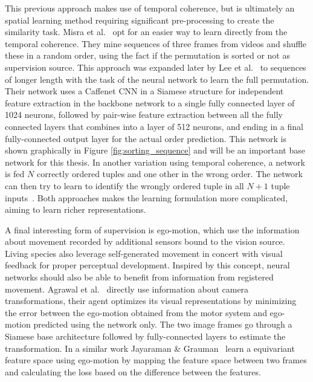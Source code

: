 This previous approach makes use of temporal coherence, but is ultimately an spatial learning method requiring significant pre-processing to create the similarity task. Misra et al.~\cite{misra2016} opt for an easier way to learn directly from the temporal coherence. They mine sequences of three frames from videos and shuffle these in a random order, using the fact if the permutation is sorted or not as supervision source. This approach was expanded later by Lee et al.~\cite{lee2017} to sequences of longer length with the task of the neural network to learn the full permutation. Their network uses a Caffenet\cite{jia2014} CNN in a Siamese structure for independent feature extraction in the backbone network to a single fully connected layer of 1024 neurons, followed by pair-wise feature extraction between all the fully connected layers that combines into a layer of 512 neurons, and ending in a final fully-connected output layer for the actual order prediction. This network is shown graphically in Figure \ref{fig:sorting_sequence} and will be an important base network for this thesis. In another variation using temporal coherence, a network is fed $N$ correctly ordered tuples and one other in the wrong order. The network can then try to learn to identify the wrongly ordered tuple in all $N+1$ tuple inputs~\cite{fernando2017}. Both approaches makes the learning formulation more complicated, aiming to learn richer representations. 

A final interesting form of supervision is ego-motion, which use the information about movement recorded by additional sensors bound to the vision source. Living species also leverage self-generated movement in concert with visual feedback for proper perceptual development. Inspired by this concept, neural networks should also be able to benefit from information from registered movement. Agrawal et al.~\cite{agrawal2015} directly use information about camera transformations, their agent optimizes its visual representations by minimizing the error between the ego-motion obtained from the motor system and ego-motion predicted using the network only. The two image frames go through a Siamese base architecture followed by fully-connected layers to estimate the transformation. In a similar work Jayaraman \& Grauman~\cite{jayaraman2015} learn a equivariant feature space using ego-motion by mapping the feature space between two frames and calculating the loss based on the difference between the features.

